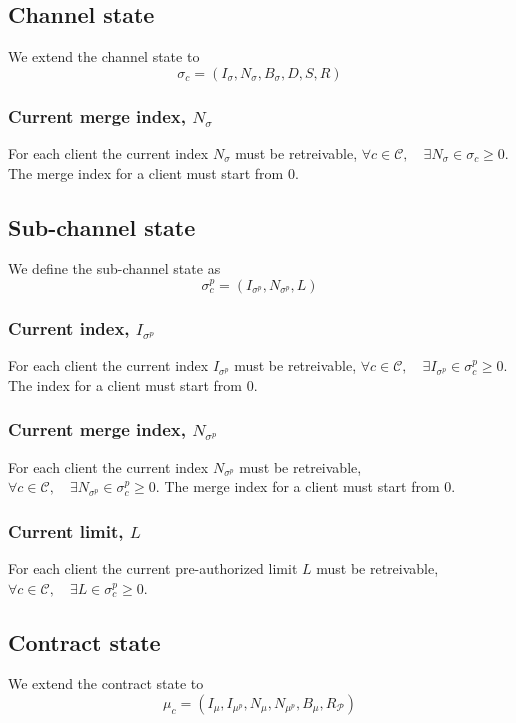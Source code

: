 \documentclass{llncs}
\begin{document}
\subsection{Channel state} We extend the channel state to
$$\sigma_c = (I_\sigma,N_\sigma,B_\sigma,D,S,R)$$

\subsubsection{Current merge index, $N_\sigma$} For each client the current index $N_\sigma$ must be retreivable, $\forall c \in \mathcal{C}, \quad \exists N_\sigma \in \sigma_c \geq 0$. The merge index for a client must start from 0.

\subsection{Sub-channel state} We define the sub-channel state as
$$\sigma^p_c = (I_{\sigma^p},N_{\sigma^p},L)$$

\subsubsection{Current index, $I_{\sigma^p}$} For each client the current index $I_{\sigma^p}$ must be retreivable, $\forall c \in \mathcal{C}, \quad \exists I_{\sigma^p} \in \sigma^p_c \geq 0$. The index for a client must start from 0.

\subsubsection{Current merge index, $N_{\sigma^p}$} For each client the current index $N_{\sigma^p}$ must be retreivable, $\forall c \in \mathcal{C}, \quad \exists N_{\sigma^p} \in \sigma^p_c \geq 0$. The merge index for a client must start from 0.

\subsubsection{Current limit, $L$} For each client the current pre-authorized limit $L$ must be retreivable, $\forall c \in \mathcal{C}, \quad \exists L \in \sigma^p_c \geq 0$.

\subsection{Contract state} We extend the contract state to
$$\mu_c = (I_\mu,I_{\mu^p},N_\mu,N_{\mu^p},B_\mu,R_\mathcal{P})$$
\end{document}
